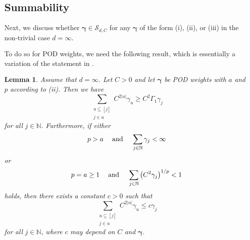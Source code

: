 \documentclass{article}
\newcommand{\N}  {{\mathbb N}}
\newcommand{\bg}{{\boldsymbol{\gamma}}}
\newcommand{\SSS}{\mathcal{S}}
\theoremstyle{plain}
\newtheorem{lemma}{Lemma}
\theoremstyle{definition}
\begin{document}
\subsection{Summability}

Next, we discuss whether $\bg \in \SSS_{d,C}$ for any 
$\bg$ of the form (i), (ii), or (iii) in the non-trivial 
case $d=\infty$.

To do so for POD weights, we need 
the following result,
which is essentially a variation of the statement in 
\citet[Thm. 5]{DG12}.

\begin{lemma}\label{prel4}
Assume that $d = \infty$. Let $C>0$ and let $\bg$ be
POD weights with $a$ and $p$ according to (ii).
Then we have
\begin{equation}\label{iq:trivial_lower_bound}
\sum_{\substack{u \subseteq [j] \\ j\in u}}
C^{2|u|} \gamma_u \ge C^2  \Gamma_1 \gamma_j
\end{equation}
for all $j\in\N$. Furthermore, 
if either 
\begin{equation}\label{cond_p>a}
p>a \hspace{3ex}\text{and}\hspace{3ex} \sum_{j\in\N}\gamma_j < \infty
\end{equation}
or 
\begin{equation}\label{cond_p=a}
p=a \ge 1 \hspace{3ex}\text{and}\hspace{3ex}
\sum_{j\in\N} \left( C^{2} \gamma_j \right)^{1/p} < 1
\end{equation}
holds,  then there exists a constant $c >0$
such that 
\begin{equation}\label{dg_14}
\sum_{\substack{u \subseteq [j] \\ j\in u}}
C^{2|u|} \gamma_u \le c \gamma_j
\end{equation}
for all $j\in\N$, where $c$ may depend on $C$ and $\bg$.
\end{lemma}
\end{document}
